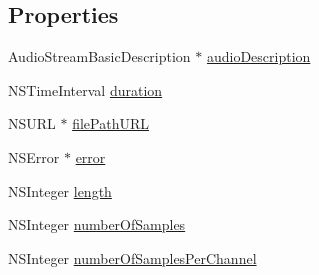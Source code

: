 \subsection*{Properties}
\begin{DoxyCompactItemize}
\item 
Audio\-Stream\-Basic\-Description $\ast$ \hyperlink{interface_s_e_audio_stream_a96f11351b56bdd1d363ad05fb80d1a73}{audio\-Description}
\item 
N\-S\-Time\-Interval \hyperlink{interface_s_e_audio_stream_af5e4493693cf24fa25af34487993d693}{duration}
\item 
N\-S\-U\-R\-L $\ast$ \hyperlink{interface_s_e_audio_stream_a7561aaa75262c747a4da3d701e2094b9}{file\-Path\-U\-R\-L}
\item 
N\-S\-Error $\ast$ \hyperlink{interface_s_e_audio_stream_a095232a32323fc1b43568e1609cc934d}{error}
\item 
N\-S\-Integer \hyperlink{interface_s_e_audio_stream_a54229ab240455736790dad362c5335e1}{length}
\item 
N\-S\-Integer \hyperlink{interface_s_e_audio_stream_a1e8d0ba4849fffe376bcf5494987c9a8}{number\-Of\-Samples}
\item 
N\-S\-Integer \hyperlink{interface_s_e_audio_stream_afac964b9badc8642c250a2234eb3c044}{number\-Of\-Samples\-Per\-Channel}
\end{DoxyCompactItemize}


